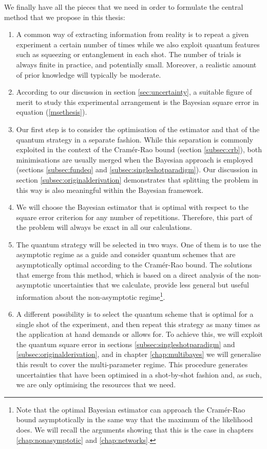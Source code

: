We finally have all the pieces that we need in order to formulate the central method that we propose in this thesis:
\begin{enumerate}
\item A common way of extracting information from reality is to repeat a given experiment a certain number of times while we also exploit quantum features such as squeezing or entanglement in each shot. The number of trials is always finite in practice, and potentially small. Moreover, a realistic amount of prior knowledge will typically be moderate.
\item According to our discussion in section \ref{sec:uncertainty}, a suitable figure of merit to study this experimental arrangement is the Bayesian square error in equation (\ref{msethesis}). 
\item Our first step is to consider the optimisation of the estimator and that of the quantum strategy in a separate fashion. While this separation is commonly exploited in the context of the Cram\'{e}r-Rao bound (section \ref{subsec:crb}), both minimisations are usually merged when the Bayesian approach is employed (sections \ref{subsec:fundeq} and \ref{subsec:singleshotparadigm}). Our discussion in section \ref{subsec:originalderivation} demonstrates that splitting the problem in this way is also meaningful within the Bayesian framework.
\item We will choose the Bayesian estimator that is optimal with respect to the square error criterion for any number of repetitions. Therefore, this part of the problem will always be exact in all our calculations. 
\item The quantum strategy will be selected in two ways. One of them is to use the asymptotic regime as a guide and consider quantum schemes that are asymptotically optimal according to the Cram\'{e}r-Rao bound. The solutions that emerge from this method, which is based on a direct analysis of the non-asymptotic uncertainties that we calculate, provide less general but useful information about the non-asymptotic regime\footnote{Note that the optimal Bayesian estimator can approach the Cram\'{e}r-Rao bound asymptotically in the same way that the maximum of the likelihood does. We will recall the arguments showing that this is the case in chapters \ref{chap:nonasymptotic} and \ref{chap:networks}.}.
\item A different possibility is to select the quantum scheme that is optimal for a single shot of the experiment, and then repeat this strategy as many times as the application at hand demands or allows for. To achieve this, we will exploit the quantum square error in sections \ref{subsec:singleshotparadigm} and \ref{subsec:originalderivation}, and in chapter \ref{chap:multibayes} we will generalise this result to cover the multi-parameter regime. This procedure generates uncertainties that have been optimised in a shot-by-shot fashion and, as such, we are only optimising the resources that we need.  
\end{enumerate}


